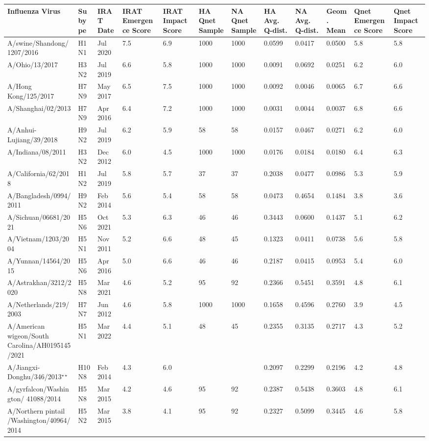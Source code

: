 \begin{tabular}{L{1.32in}|L{.35in}|L{.3in}|L{.3in}|L{.3in}|L{.35in}|L{.35in}|L{.35in}|L{.35in}|L{.32in}|L{.3in}|L{.3in}}\hline
Influenza Virus & Subype & IRAT Date &IRAT Emergence Score &IRAT Impact Score &HA Qnet Sample &NA Qnet Sample &HA Avg. Q-dist. &NA Avg. Q-dist. &Geom. Mean&Qnet Emergence Score&Qnet Impact Score \\\hline
 A/swine/Shandong/1207/2016 &H1N1& Jul  2020 &7.5&6.9&1000&1000&0.0599&0.0417&0.0500&5.8&5.8\\\hline
 A/Ohio/13/2017 &H3N2& Jul  2019 &6.6&5.8&1000&1000&0.0091&0.0692&0.0251&6.2&6.0\\\hline
 A/Hong  Kong/125/2017 &H7N9& May  2017 &6.5&7.5&1000&1000&0.0092&0.0046&0.0065&6.7&6.6\\\hline
 A/Shanghai/02/2013 &H7N9& Apr  2016 &6.4&7.2&1000&1000&0.0031&0.0044&0.0037&6.8&6.6\\\hline
 A/Anhui-Lujiang/39/2018 &H9N2& Jul  2019 &6.2&5.9&58&58&0.0157&0.0467&0.0271&6.2&6.0\\\hline
 A/Indiana/08/2011 &H3N2& Dec  2012 &6.0&4.5&1000&1000&0.0176&0.0184&0.0180&6.4&6.3\\\hline
 A/California/62/2018 &H1N2& Jul  2019 &5.8&5.7&37&37&0.2038&0.0477&0.0986&5.3&5.9\\\hline
 A/Bangladesh/0994/2011 &H9N2& Feb  2014 &5.6&5.4&58&58&0.0473&0.4654&0.1484&3.8&3.6\\\hline
 A/Sichuan/06681/2021 &H5N6& Oct  2021 &5.3&6.3&46&46&0.3443&0.0600&0.1437&5.1&6.2\\\hline
 A/Vietnam/1203/2004 &H5N1& Nov  2011 &5.2&6.6&48&45&0.1323&0.0411&0.0738&5.6&5.8\\\hline
 A/Yunnan/14564/2015 &H5N6& Apr  2016 &5.0&6.6&46&46&0.2187&0.0415&0.0953&5.4&6.0\\\hline
 A/Astrakhan/3212/2020 &H5N8& Mar  2021 &4.6&5.2&95&92&0.2366&0.5451&0.3591&4.8&6.1\\\hline
 A/Netherlands/219/2003 &H7N7& Jun  2012 &4.6&5.8&1000&1000&0.1658&0.4596&0.2760&3.9&4.5\\\hline
 A/American  wigeon/South  Carolina/AH0195145/2021 &H5N1& Mar  2022 &4.4&5.1&48&45&0.2355&0.3135&0.2717&4.3&5.2\\\hline
 A/Jiangxi-Donghu/346/2013$^{\star\star}$ &H10N8& Feb  2014 &4.3&6.0&&&0.2097&0.2299&0.2196&4.2&4.8\\\hline
 A/gyrfalcon/Washington/ 41088/2014 &H5N8& Mar  2015 &4.2&4.6&95&92&0.2387&0.5438&0.3603&4.8&6.1\\\hline
 A/Northern  pintail /Washington/40964/2014 &H5N2& Mar  2015 &3.8&4.1&95&92&0.2327&0.5099&0.3445&4.6&5.8\\\hline

\end{tabular}
